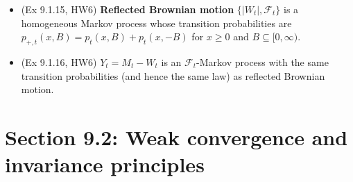 \documentclass[twoside]{article}
\newcommand\calF{\mathcal{F}}
\begin{document}
\begin{itemize}
\item (Ex 9.1.15, HW6) \textbf{Reflected Brownian motion} $\{ |W_t|, \calF_t \}$ is a homogeneous Markov process whose transition probabilities are $p_{+,t}(x,B) = p_t(x, B) + p_t(x, -B)$ for $x \geq 0$ and $B \subseteq [0,\infty)$.

\item (Ex 9.1.16, HW6) $Y_t = M_t - W_t$ is an $\calF_t$-Markov process with the same transition probabilities (and hence the same law) as reflected Brownian motion.

\end{itemize}

\section*{Section 9.2: Weak convergence and invariance principles}
\end{document}
